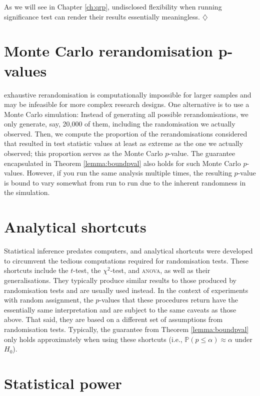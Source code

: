 \documentclass[a4paper]{tufte-book}\usepackage[]{graphicx}\usepackage[]{xcolor}
\newcommand*{\parend}[1][$\diamondsuit$]{%
  \unskip\nobreak\hspace{1em plus 1fill}$\diamondsuit$%
}
\begin{document}
  As we will see in Chapter \ref{ch:qrp}, undisclosed flexibility when
  running significance test can render their results essentially meaningless.
\parend

\section{Monte Carlo rerandomisation p-values}
exhaustive rerandomisation is computationally impossible for larger samples 
and may be infeasible for more complex research designs.
One alternative is to use a Monte Carlo simulation:
Instead of generating all possible rerandomisations, 
we only generate, say, 20,000 of them, including the randomisation we actually observed.
Then, we compute the proportion of the rerandomisations considered that resulted
in test statistic values at least as extreme as the one we actually observed;
this proportion serves as the Monte Carlo $p$-value.
The guarantee encapsulated in Theorem \ref{lemma:boundpval} also holds for
such Monte Carlo $p$-values.
However, if you run the same analysis multiple times, 
the resulting $p$-value is bound to vary somewhat from run to run 
due to the inherent randomness in the simulation.

\section{Analytical shortcuts}
Statistical inference predates computers, and analytical shortcuts were developed
to circumvent the tedious computations required for randomisation tests.
These shortcuts include the $t$-test, the $\chi^2$-test, and \textsc{anova}, 
as well as their generalisations.
They typically produce similar results to those produced by randomisation tests
and are usually used instead.
In the context of experiments with random assignment,
the $p$-values that these procedures return have
the essentially same interpretation and are subject to the same caveats as those above.
That said, they are based on a different set of assumptions from randomisation tests.
Typically,
the guarantee from Theorem \ref{lemma:boundpval} only holds approximately
when using these shortcuts
(i.e., $\mathbb{P}(p \leq \alpha) \approx \alpha$ under $H_0$).

\section{Statistical power}\label{sec:power}
\end{document}
